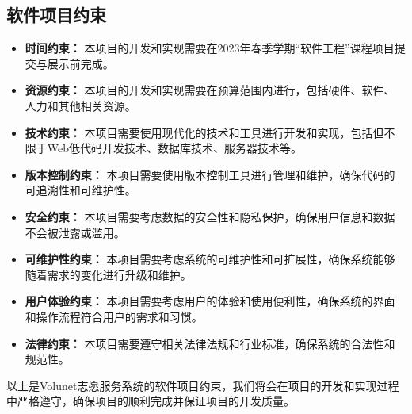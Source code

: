


\subsection{软件项目约束}

\begin{itemize}[itemsep=2pt,topsep=0pt,parsep=4pt,itemindent=1em]
    \item \textbf{时间约束：} 本项目的开发和实现需要在2023年春季学期“软件工程”课程项目提交与展示前完成。
    \item \textbf{资源约束：} 本项目的开发和实现需要在预算范围内进行，包括硬件、软件、人力和其他相关资源。
    \item \textbf{技术约束：} 本项目需要使用现代化的技术和工具进行开发和实现，包括但不限于Web低代码开发技术、数据库技术、服务器技术等。
    \item \textbf{版本控制约束：} 本项目需要使用版本控制工具进行管理和维护，确保代码的可追溯性和可维护性。
    \item \textbf{安全约束：} 本项目需要考虑数据的安全性和隐私保护，确保用户信息和数据不会被泄露或滥用。
    \item \textbf{可维护性约束：} 本项目需要考虑系统的可维护性和可扩展性，确保系统能够随着需求的变化进行升级和维护。
    \item \textbf{用户体验约束：} 本项目需要考虑用户的体验和使用便利性，确保系统的界面和操作流程符合用户的需求和习惯。
    \item \textbf{法律约束：} 本项目需要遵守相关法律法规和行业标准，确保系统的合法性和规范性。
\end{itemize}


以上是Volunet志愿服务系统的软件项目约束，我们将会在项目的开发和实现过程中严格遵守，确保项目的顺利完成并保证项目的开发质量。

\newpage
